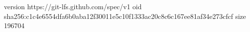 version https://git-lfs.github.com/spec/v1
oid sha256:c1c4e6554dfa6b0aba12f30011e5c10f1333ac20c8c6c167ee81af34e273cfcf
size 196704
